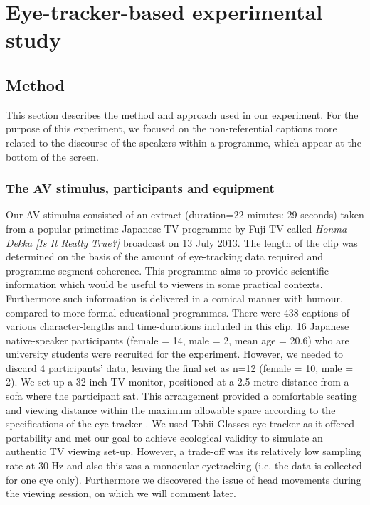 \documentclass[output=paper]{langsci/langscibook}
\begin{document}
\section{Eye-tracker-based experimental study}

\subsection{Method}

This section describes the method and approach used in our experiment. For the purpose of this experiment, we focused on the non-referential captions more related to the discourse of the speakers within a programme, which appear at the bottom of the screen.  

\subsubsection{The AV stimulus, participants and equipment}

Our AV stimulus consisted of an extract (duration=22 minutes: 29 seconds) taken from a popular primetime Japanese TV programme by Fuji TV called \textit{Honma Dekka [Is It Really True?]} broadcast on 13 July 2013. The length of the clip was determined on the basis of the amount of eye-tracking data required and programme segment coherence.  This programme aims to provide scientific information which would be useful to viewers in some practical contexts. Furthermore such information is delivered in a comical manner with humour, compared to more formal educational programmes. There were 438 captions of various character-lengths and time-durations included in this clip. 16 Japanese native-speaker participants (female = 14, male = 2, mean age = 20.6) who are university students were recruited for the experiment. However, we needed to discard 4 participants' data, leaving the final set as n=12 (female = 10, male = 2). We set up a 32-inch TV monitor, positioned at a 2.5-metre distance from a sofa where the participant sat. This arrangement provided a comfortable seating and viewing distance within the maximum allowable space according to the specifications of the eye-tracker \citep{Tobii2012}. We used Tobii Glasses eye-tracker as it offered portability and met our goal to achieve ecological validity to simulate an authentic TV viewing set-up. However, a trade-off was its relatively low sampling rate at 30 Hz and also this was a monocular eyetracking (i.e. the data is collected for one eye only).  Furthermore we discovered the issue of head movements during the viewing session, on which we will comment later.  
\end{document}

